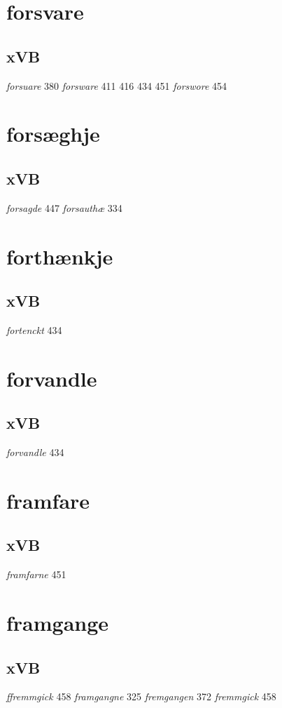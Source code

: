 \documentclass[a4paper,twocolumn]{article}
\begin{document}
\section{forsvare}
\label{sec:org5999e68}
\subsection{xVB}
\label{sec:orgdadabc2}
\emph{forsuare} 380 \emph{forsware} 411 416 434 451 \emph{forswore} 454 
\section{forsæghje}
\label{sec:org1d4c111}
\subsection{xVB}
\label{sec:org39a7ce7}
\emph{forsagde} 447 \emph{forsauthæ} 334 
\section{forthænkje}
\label{sec:org3606bff}
\subsection{xVB}
\label{sec:org3f68ccb}
\emph{fortenckt} 434 
\section{forvandle}
\label{sec:org8415b1d}
\subsection{xVB}
\label{sec:org3398e2f}
\emph{forvandle} 434 
\section{framfare}
\label{sec:org277b88e}
\subsection{xVB}
\label{sec:orgf9f0bfa}
\emph{framfarne} 451 
\section{framgange}
\label{sec:org51d09db}
\subsection{xVB}
\label{sec:org855cd3d}
\emph{ffremmgick} 458 \emph{framgangne} 325 \emph{fremgangen} 372 \emph{fremmgick} 458 
\end{document}
